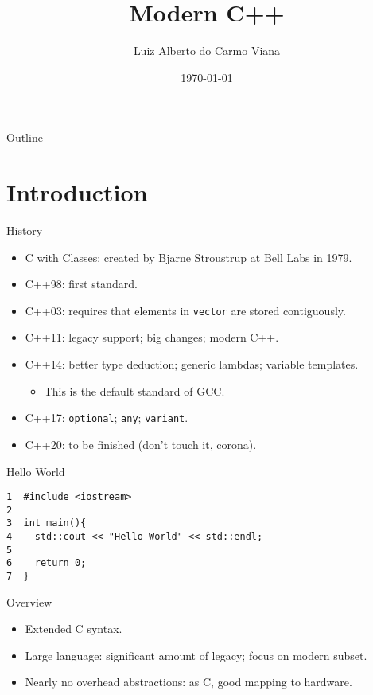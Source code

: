 \documentclass[presentation]{beamer}
\author{Luiz Alberto do Carmo Viana}
\date{\today}
\title{Modern C++}
\begin{document}
\maketitle
\begin{frame}{Outline}
\tableofcontents
\end{frame}


\section{Introduction}
\label{sec:org1bcbcfd}
\begin{frame}[label={sec:org3bf9bb6},fragile]{History}
 \begin{itemize}
\item C with Classes: created by Bjarne Stroustrup at Bell Labs in 1979.
\item C++98: first standard.
\item C++03: requires that elements in \texttt{vector} are stored contiguously.
\item C++11: legacy support; big changes; modern C++.
\item C++14: better type deduction; generic lambdas; variable
templates.
\begin{itemize}
\item This is the default standard of GCC.
\end{itemize}
\item C++17: \texttt{optional}; \texttt{any}; \texttt{variant}.
\item C++20: to be finished (don't touch it, corona).
\end{itemize}
\end{frame}

\begin{frame}[label={sec:org1b69872},fragile]{Hello World}
 \begin{verbatim}
1  #include <iostream>
2  
3  int main(){
4    std::cout << "Hello World" << std::endl;
5  
6    return 0;
7  }
\end{verbatim}
\end{frame}

\begin{frame}[label={sec:org420774d}]{Overview}
\begin{itemize}
\item Extended C syntax.
\item Large language: significant amount of legacy; focus on modern
subset.
\item Nearly no overhead abstractions: as C, good mapping to hardware.
\end{itemize}
\end{frame}
\end{document}

